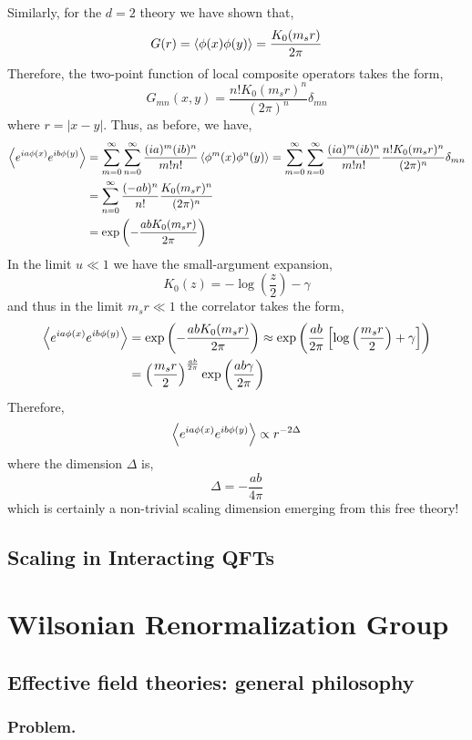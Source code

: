 \documentclass[12pt]{article}
\begin{document}
Similarly, for the $d = 2$ theory we have shown that,
\[ G(r) = \left< \phi(x) \phi(y) \right> = \frac{K_0(m_s r)}{2\pi} \]
Therefore, the two-point function of local composite operators takes the form,
\[ G_{mn}(x, y) = \frac{n! K_0(m_s r)^n}{(2 \pi)^n} \delta_{mn} \]
where $r = |x - y|$. Thus, as before, we have,
\begin{align*}
\left< e^{ia \phi(x)} e^{i b \phi(y)} \right> & = \sum_{m = 0}^\infty \sum_{n = 0}^\infty \frac{(i a)^m (i b)^n}{m! n!} \left< \phi^m(x) \phi^n(y) \right> = \sum_{m = 0}^\infty \sum_{n = 0}^\infty \frac{(i a)^m (i b)^n}{m! n!} \frac{n! K_0(m_s r)^n}{(2 \pi)^n} \delta_{mn}
\\
& = \sum_{n = 0}^{\infty} \frac{(- a b)^n}{n!} \frac{K_0(m_s r)^n}{(2 \pi)^n}
\\
& = \exp{\left( - \frac{ab K_0(m_s r)}{2 \pi} \right)}
\end{align*}
In the limit $u \ll 1$ we have the small-argument expansion,
\[ K_0(z) = - \log{\left( \frac{z}{2} \right)} - \gamma \]
and thus in the limit $m_s r \ll 1$ the correlator takes the form,
\begin{align*}
\left< e^{ia \phi(x)} e^{i b \phi(y)} \right> & = \exp{\left( - \frac{ab K_0(m_s r)}{2 \pi} \right)} \approx \exp{\left( \frac{ab}{2 \pi} \left[ \log{\left( \frac{m_s r}{2} \right)} +  \gamma \right] \right)}
\\
& = \left( \frac{m_s r}{2} \right)^{\frac{ab}{2 \pi}} \exp{\left(\frac{ab \gamma}{2 \pi}\right)}
\end{align*}
Therefore,
\[ \left< e^{ia \phi(x)} e^{i b \phi(y)} \right> \propto r^{-2\Delta} \]
where the dimension $\Delta$ is,
\[ \Delta = - \frac{ab}{4 \pi} \]
which is certainly a non-trivial scaling dimension emerging from this free theory!

\subsection{Scaling in Interacting QFTs}

\section{Wilsonian Renormalization Group}

\subsection{Effective field theories: general philosophy}

\subsubsection{Problem.}
\end{document}

